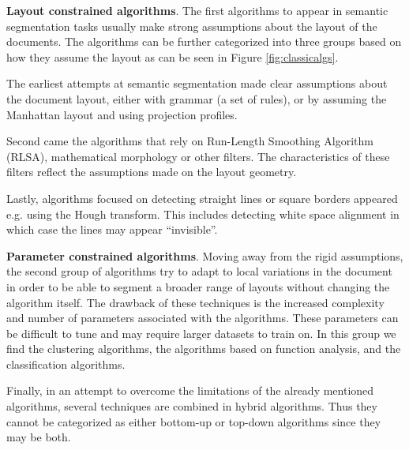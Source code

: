 \documentclass[english, bibtex]{kththesis}
\begin{document}
\textbf{Layout constrained algorithms}. The first algorithms to appear in semantic segmentation tasks usually make strong assumptions about the layout of the documents. The algorithms can be further categorized into three groups based on how they assume the layout as can be seen in Figure \ref{fig:classicalgs}.

The earliest attempts at semantic segmentation made clear assumptions about the document layout, either with grammar (a set of rules), or by assuming the Manhattan layout and using projection profiles.
    
Second came the algorithms that rely on Run-Length Smoothing Algorithm (RLSA), mathematical morphology or other filters. The characteristics of these filters reflect the assumptions made on the layout geometry. 
    
Lastly, algorithms focused on detecting straight lines or square borders appeared e.g. using the Hough transform. This includes detecting white space alignment in which case the lines may appear “invisible”.
    
\textbf{Parameter constrained algorithms}. Moving away from the rigid assumptions, the second group of algorithms try to adapt to local variations in the document in order to be able to segment a broader range of layouts without changing the algorithm itself. The drawback of these techniques is the increased complexity and number of parameters associated with the algorithms. These parameters can be difficult to tune and may require larger datasets to train on. In this group we find the clustering algorithms, the algorithms based on function analysis, and the classification algorithms. 

Finally, in an attempt to overcome the limitations of the already mentioned algorithms, several techniques are combined in hybrid algorithms. Thus they cannot be categorized as either bottom-up or top-down algorithms since they may be both.  
\end{document}
